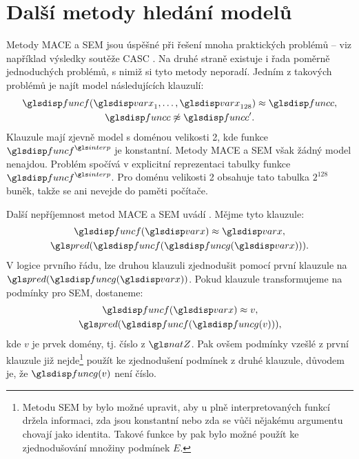 \section{Další metody hledání modelů}

Metody MACE a SEM jsou úspěšné při řešení mnoha praktických problémů
-- viz například výsledky soutěže CASC \cite{sutcliffe2006casc}.
Na druhé straně existuje i řada poměrně jednoduchých problémů,
s nimiž si tyto metody neporadí. Jedním z takových problémů
je najít model následujících klauzulí:
\begin{gather*}
  \func(\var_1 \comdots \var_{128}) \approx \funcC, \\
  \funcC \not\approx \funcC'.
\end{gather*}
Klauzule mají zjevně model s doménou velikosti 2, kde funkce $\func^\interp$
je konstantní. Metody MACE a SEM však žádný model nenajdou.
Problém spočívá v explicitní reprezentaci tabulky funkce $\func^\interp$.
Pro doménu velikosti 2 obsahuje tato tabulka $2^{128}$ buněk,
takže se ani nevejde do paměti počítače.

Další nepříjemnost metod MACE a SEM uvádí \cite{hillenbrand2013superposition}.
Mějme tyto klauzule:
\begin{gather*}
\func(\var) \approx \var, \\
\pred(\func(\funcG(\var))).
\end{gather*}
V logice prvního řádu, lze
druhou klauzuli zjednodušit pomocí první klauzule na $\pred(\funcG(\var))$.
Pokud klauzule transformujeme na podmínky pro SEM, dostaneme:
\begin{gather*}
\func(\var) \approx v, \\
\pred(\func(\funcG(v))),
\end{gather*}
kde $v$ je prvek domény, tj. číslo z $\natZ$.
Pak ovšem podmínky vzešlé z první klauzule již nejde\footnote{Metodu
SEM by bylo možné upravit, aby u plně interpretovaných funkcí
držela informaci, zda jsou konstantní nebo zda
se vůči nějakému argumentu chovají jako identita.
Takové funkce by pak bylo možné použít ke zjednodušování množiny
podmínek $E$.}
použít ke zjednodušení podmínek z druhé klauzule, důvodem je, že
$\funcG(v)$ není číslo.


